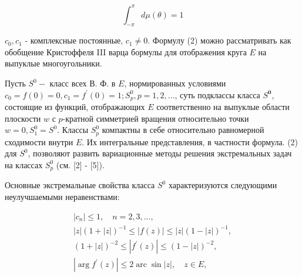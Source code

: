 \documentclass[10pt]{article}
\begin{document}
\[

\int_{-\pi}^{\pi} d \mu(\theta)=1

\]



$c_{0}, c_{1}$ - комплексные постоянные, $c_{1} \neq 0$. Формулу (2) можно рассматривать как обобщение Кристоффеля III варца бормулы для отображения круга $E$ на выпуклые многоугольники.



Пусть $S^{0}-$ класс всех В. Ф. в $E$, нормированных условиями $c_{0}=f(0)=0, c_{1}=f^{\prime}(0)=1 ; S_{p}^{0}, p=1,2, \ldots$, суть подклассы класса $S^{\mathbf{0}}$, состоящие из функций, отображающих $E$ соответственно на выпуклые области плоскости $w$ с $p$-кратной симметрией вращения относительно точки $w=0, S_{1}^{0}=S^{0}$. Классы $S_{p}^{0}$ компактны в себе относительно равномерной сходимости внутри $E$. Их интегральные представления, в частности формула. (2) для $S^{0}$, позволяют развить вариационные методы решения экстремальных задач на классах $S_{p}^{0}$ (см. [2] - [5]).



Основные экстремальные свойства класса $S^{0}$ характеризуются следующими неулучшаемыми неравенствами:



\[

\begin{gathered}

\left|c_{n}\right| \leqslant 1, \quad n=2,3, \ldots, \\

|z|(1+|z|)^{-1} \leqslant|f(z)| \leqslant|z|(1-|z|)^{-1}, \\

(1+|z|)^{-2} \leqslant\left|f^{\prime}(z)\right| \leqslant(1-|z|)^{-2}, \\

\left|\arg f^{\prime}(z)\right| \leqslant 2 \operatorname{arc} \sin |z|, \quad z \in E,

\end{gathered}

\]
\end{document}
